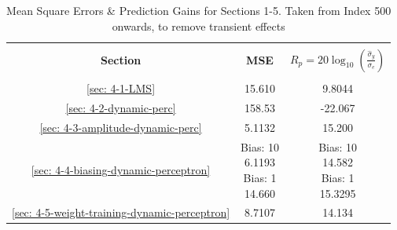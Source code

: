 \documentclass[12pt]{article}
\numberwithin{equation}{section}
\begin{document}
		\begin{minipage}[t]{0.45\textwidth}
			\begin{table}[H]
				\centering
				\begin{tabular}{|c|c|c|}
					\hline
					&&\\[-1em]
					\textbf{Section} & \textbf{MSE} & \textbf{$R_p = 20\log_{10}({\frac{\hat{\sigma}_y}{\sigma_e}})$} \\
					&&\\[-1em]
					\hline
					\hline
					\ref{sec: 4-1-LMS}	&	15.610		&	9.8044 \\
					\hline
					\ref{sec: 4-2-dynamic-perc}	&	158.53	&	-22.067 \\
					\hline
					\ref{sec: 4-3-amplitude-dynamic-perc}	&	5.1132		&	15.200 \\
					\hline
					\ref{sec: 4-4-biasing-dynamic-perceptron} 	&	\makecell{ Bias: 10 \\ 6.1193 \\ Bias: 1 \\ 14.660 \\}		&	\makecell{ Bias: 10 \\ 14.582 \\ Bias: 1 \\ 15.3295 \\} \\
					\hline
					\ref{sec: 4-5-weight-training-dynamic-perceptron}	&	8.7107		&	14.134 \\
					\hline
				\end{tabular}
				\captionsetup{justification=centering}
				\caption{Mean Square Errors \& Prediction Gains for Sections 1-5. Taken from Index 500 onwards, to remove transient effects}
				\label{tab: 4-mse-Rp-500+}
			\end{table}
		\end{minipage}%
		
	
\end{document}
